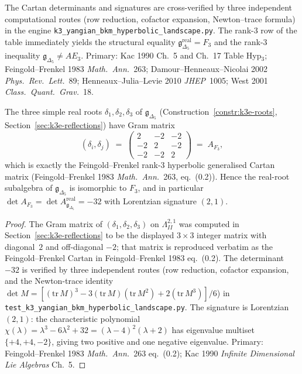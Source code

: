\begin{remark}
\begin{center}
\begin{tabular}{lccl}
\bottomrule
\end{tabular}
\end{center}
The Cartan determinants and signatures are cross-verified by three
independent computational routes (row reduction, cofactor expansion,
Newton--trace formula) in the engine
\texttt{k3\_yangian\_bkm\_hyperbolic\_landscape.py}. The
rank-$3$ row of the table immediately yields the structural equality
$\mathfrak{g}_{\Delta_5}^{\mathrm{real}} = F_3$ and the rank-$3$
inequality $\mathfrak{g}_{\Delta_5} \neq AE_3$. Primary:
Kac 1990 Ch.~5 and Ch.~17 Table Hyp$_3$;
Feingold--Frenkel 1983 \emph{Math.\ Ann.}~263;
Damour--Henneaux--Nicolai 2002 \emph{Phys.\ Rev.\ Lett.}~89;
Henneaux--Julia--Levie 2010 \emph{JHEP}~1005;
West 2001 \emph{Class.\ Quant.\ Grav.}~18.
\end{remark}

\begin{proposition}
\label{prop:bkm-delta5-real-cartan-is-F3}
The three simple real roots $\delta_1, \delta_2, \delta_3$ of
$\mathfrak{g}_{\Delta_5}$ (Construction~\ref{constr:k3e-roots},
Section~\ref{sec:k3e-reflections}) have Gram matrix
\[
 (\delta_i, \delta_j) \;=\; \begin{pmatrix} 2 & -2 & -2 \\ -2 & 2 & -2 \\ -2 & -2 & 2 \end{pmatrix}
 \;=\; A_{F_3},
\]
which is exactly the Feingold--Frenkel rank-$3$ hyperbolic generalised
Cartan matrix (Feingold--Frenkel 1983 \emph{Math.\ Ann.}~263, eq.~(0.2)).
Hence the real-root subalgebra of $\mathfrak{g}_{\Delta_5}$ is
isomorphic to $F_3$, and in particular
$\det A_{F_3} = \det A_{\mathfrak{g}_{\Delta_5}}^{\mathrm{real}} = -32$
with Lorentzian signature $(2, 1)$.
\end{proposition}

\begin{proof}
The Gram matrix of $(\delta_1, \delta_2, \delta_3)$ on
$\Lambda^{2,1}_{II}$ was computed in
Section~\ref{sec:k3e-reflections}
to be the displayed $3\times 3$ integer matrix with diagonal~$2$ and
off-diagonal $-2$; that matrix is reproduced verbatim as the
Feingold--Frenkel Cartan in Feingold--Frenkel 1983 eq.~(0.2). The
determinant $-32$ is verified by three independent routes (row
reduction, cofactor expansion, and the Newton-trace identity
$\det M = [(\mathrm{tr}\,M)^3 - 3(\mathrm{tr}\,M)(\mathrm{tr}\,M^2) +
2(\mathrm{tr}\,M^3)]/6$) in
\texttt{test\_k3\_yangian\_bkm\_hyperbolic\_landscape.py}.
The signature is Lorentzian $(2, 1)$: the characteristic polynomial
$\chi(\lambda) = \lambda^3 - 6\lambda^2 + 32 = (\lambda - 4)^2
(\lambda + 2)$ has eigenvalue multiset $\{+4, +4, -2\}$, giving two
positive and one negative eigenvalue. Primary: Feingold--Frenkel 1983
\emph{Math.\ Ann.}~263 eq.~(0.2); Kac 1990 \emph{Infinite Dimensional
Lie Algebras} Ch.~5.
\end{proof}


